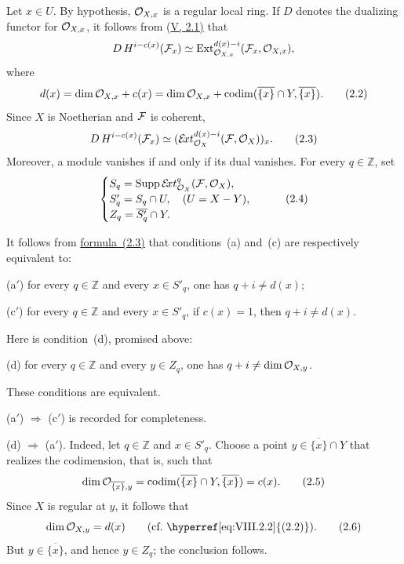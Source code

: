 Let $x\in U$. By hypothesis, $\mathcal O_{X,x}$ is a regular local ring. If $D$
denotes the dualizing functor for $\mathcal O_{X,x}$, it follows from (\hyperref[V.2.1]{V, 2.1)} that
\[
  D\,H^{i-c(x)}(\cF_x)\simeq
  \operatorname{Ext}^{d(x)-i}_{\cO_{X,x}}(\cF_x,\cO_{X,x}),
\]
where
\begin{equation}\label{eq:VIII.2.2}
  d(x)=\dim\mathcal O_{X,x}+c(x)
      =\dim\mathcal O_{X,x}
       +\operatorname{codim}(\overline{\{x\}}\cap Y,\overline{\{x\}}).
  \tag{2.2}
\end{equation}
Since $X$ is Noetherian and $\cF$ is coherent,
\begin{equation}\label{eq:VIII.2.3}
  D\,H^{i-c(x)}(\cF_x)\simeq
  (\sExt^{d(x)-i}_{\cO_X}(\cF,\cO_X))_x.
  \tag{2.3}
\end{equation}
Moreover, a module vanishes if and only if its dual vanishes. For every $q\in\mathbb Z$, set
\begin{equation}\label{eq:VIII.2.4}
  \begin{cases}
    S_q=\Supp\sExt^q_{\cO_X}(\cF,\cO_X),\\
    S'_q=S_q\cap U,\quad (U=X-Y),\\
    Z_q=\overline{S'_q}\cap Y.
  \end{cases}
  \tag{2.4}
\end{equation}

\medskip
It follows from \hyperref[eq:VIII.2.3]{formula~(2.3)} that conditions~(a) and~(c) are respectively
equivalent to:

\medskip
\noindent\textup{(a$'$)} for every $q\in\mathbb Z$ and every $x\in S'_q$,
one has $q+i\ne d(x)$;

\smallskip
\noindent\textup{(c$'$)} for every $q\in\mathbb Z$ and every $x\in S'_q$,
if $c(x)=1$, then $q+i\ne d(x)$.

\medskip
\noindent Here is condition~(d), promised above:

\medskip
\noindent\textup{(d)} for every $q\in\mathbb Z$ and every $y\in Z_q$,
one has $q+i\ne\dim\mathcal O_{X,y}$.

\medskip
\noindent These conditions are equivalent.

\smallskip
\noindent\textup{(a$'$)} $\Rightarrow$ \textup{(c$'$)} is recorded for
completeness.

\smallskip
\noindent\textup{(d)} $\Rightarrow$ \textup{(a$'$)}. Indeed, let
$q\in\mathbb Z$ and $x\in S'_q$. Choose a point
$y\in\overline{\{x\}}\cap Y$ that realizes the
codimension, that is,
such that
\begin{equation}\label{eq:VIII.2.5}
  \dim\mathcal O_{\overline{\{x\}},y}
  =\operatorname{codim}(\overline{\{x\}}\cap Y,\overline{\{x\}})=c(x).
  \tag{2.5}
\end{equation}
Since $X$ is regular at $y$, it follows that
\begin{equation}\label{eq:VIII.2.6}
  \dim\cO_{X,y}=d(x)\qquad\text{(cf.~\hyperref[eq:VIII.2.2]{(2.2)}).}
  \tag{2.6}
\end{equation}
But $y\in\overline{\{x\}}$, and hence $y\in Z_q$; the conclusion follows.


